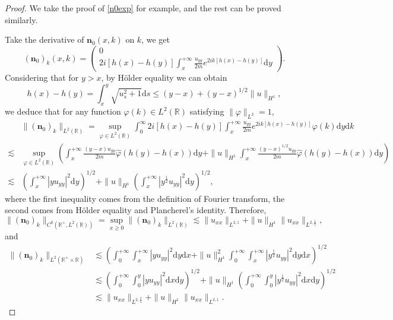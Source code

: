 \documentclass[11pt]{article}
\numberwithin{equation}{section}
\begin{document}
\begin{proof}
We take the proof of \eqref{n0exp} for example, and the rest can be proved similarly.

Take the derivative of $\textbf{n}_0(x,k)$ on $k$, we get
\begin{equation*}
(\textbf{n}_0)_k(x,k)=\left(\begin{array}{c}0\\ 2i\left[h(x)-h(y)\right]\int_x^{+\infty}\frac{u_{yy}}{2m}e^{2ik\left[h(x)-h(y)\right]}\mathrm{d}y\end{array}\right).
\end{equation*}
Considering that for $y>x$, by H\"older equality we can obtain
\begin{equation*}
h(x)-h(y)=\int_x^y\sqrt{u^2_{s}+1}\mathrm{d}s\leqslant(y-x)+(y-x)^{1/2}\| u\|_{H^{1}},
\end{equation*}
we deduce that for any function $\varphi(k)\in L^2(\mathbb{R})$ satisfying $\| \varphi\|_{L^2}=1$,
\begin{equation*}
\begin{aligned}
&\| (\textbf{n}_0)_k\|_{L^2(\mathbb{R})}=\sup_{\varphi\in L^2(\mathbb{R})}\int_0^{\infty}2i\left[h(x)-h(y)\right]\int_x^{+\infty}\frac{u_{yy}}{2m}e^{2ik\left[h(x)-h(y)\right]}\varphi(k)\mathrm{d}y\mathrm{d}k\\
\lesssim&\sup_{\varphi\in L^2(\mathbb{R})}\left(\int_x^{+\infty}\frac{(y-x)u_{yy}}{2m}\widehat{\varphi}(h(y)-h(x))\mathrm{d}y
+\| u\|_{H^{1}}\int_x^{+\infty}\frac{(y-x)^{1/2}u_{yy}}{2m}\widehat{\varphi}(h(y)-h(x))\mathrm{d}y\right)\\
\lesssim&\left(\int_x^{+\infty}|yu_{yy}|^2\mathrm{d}y\right)^{1/2}
+\| u\|_{H^{1}}\left(\int_x^{+\infty}|y^{\frac{1}{2}}u_{yy}|^2\mathrm{d}y\right)^{1/2},
\end{aligned}
\end{equation*}
where the first inequality comes from the definition of Fourier transform, the second comes from H\"older equality and Plancherel's identity.
Therefore,
\begin{equation*}
\| (\textbf{n}_0)_k\|_{C^0(\mathbb{R}^+,L^2(\mathbb{R}))}=\sup_{x\geqslant0}\| (\textbf{n}_0)_k\|_{L^2(\mathbb{R})}\lesssim\| u_{xx}\|_{L^{2,1}}+\| u\|_{H^{1}}\| u_{xx}\|_{L^{2,\frac{1}{2}}},
\end{equation*}
and
\begin{equation*}
\begin{aligned}
\| (\textbf{n}_0)_k\|_{L^2(\mathbb{R}^+\times\mathbb{R})}&\lesssim\left(\int_0^{+\infty}\int_x^{+\infty}|yu_{yy}|^2\mathrm{d}y\mathrm{d}x
+\| u\|^2_{H^{1}}\int_0^{+\infty}\int_x^{+\infty}|y^{\frac{1}{2}}u_{yy}|^2\mathrm{d}y\mathrm{d}x\right)^{1/2}\\
&\lesssim\left(\int_0^{+\infty}\int_0^y|yu_{yy}|^2\mathrm{d}x\mathrm{d}y\right)^{1/2}+\| u\|_{H^{1}}\left(\int_0^{+\infty}\int_0^y|y^{\frac{1}{2}}u_{yy}|^2\mathrm{d}x\mathrm{d}y\right)^{1/2}\\
&\lesssim\| u_{xx}\|_{L^{2,\frac{3}{2}}}+\| u\|_{H^{1}}\| u_{xx}\|_{L^{2,1}}.
\end{aligned}
\end{equation*}

\end{proof}
\end{document}
